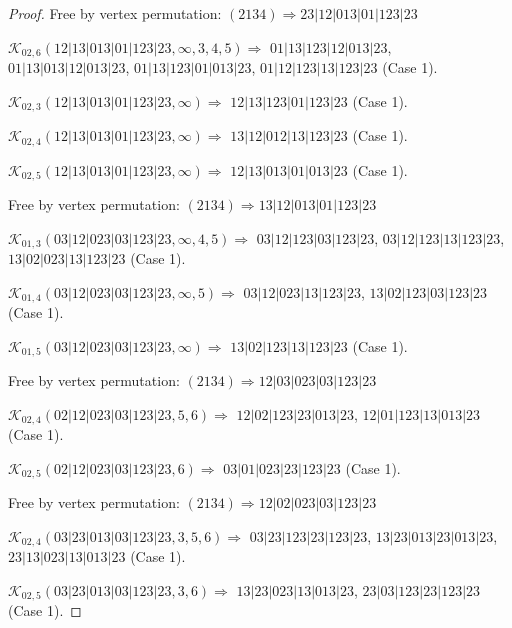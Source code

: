 \documentclass[12pt]{article}
\theoremstyle{plain}
\theoremstyle{definition}
\theoremstyle{remark}
\newcommand{\fancy}[1]{\mathcal{#1}}
\def\K{\fancy{K}}
\begin{document}
\begin{proof}
	Free by vertex permutation: $(2 1 3 4)\Rightarrow 23|12|013|01|123|23$
	
	
	
	\bigskip
	
	$\K_{02,6}(12|13|013|01|123|23,\infty,3, 4, 5)\Rightarrow $ $01|13|123|12|013|23$, $01|13|013|12|013|23$, $01|13|123|01|013|23$, $01|12|123|13|123|23$ (Case 1).
	
	$\K_{02,3}(12|13|013|01|123|23,\infty)\Rightarrow $ $12|13|123|01|123|23$ (Case 1).
	
	$\K_{02,4}(12|13|013|01|123|23,\infty)\Rightarrow $ $13|12|012|13|123|23$ (Case 1).
	
	$\K_{02,5}(12|13|013|01|123|23,\infty)\Rightarrow $ $12|13|013|01|013|23$ (Case 1).
	
	
	
	Free by vertex permutation: $(2 1 3 4)\Rightarrow 13|12|013|01|123|23$
	
	
	
	\bigskip
	
	$\K_{01,3}(03|12|023|03|123|23,\infty,4, 5)\Rightarrow $ $03|12|123|03|123|23$, $03|12|123|13|123|23$, $13|02|023|13|123|23$ (Case 1).
	
	$\K_{01,4}(03|12|023|03|123|23,\infty,5)\Rightarrow $ $03|12|023|13|123|23$, $13|02|123|03|123|23$ (Case 1).
	
	$\K_{01,5}(03|12|023|03|123|23,\infty)\Rightarrow $ $13|02|123|13|123|23$ (Case 1).
	
	
	
	Free by vertex permutation: $(2 1 3 4)\Rightarrow 12|03|023|03|123|23$
	
	
	
	\bigskip
	
	$\K_{02,4}(02|12|023|03|123|23,5, 6)\Rightarrow $ $12|02|123|23|013|23$, $12|01|123|13|013|23$ (Case 1).
	
	$\K_{02,5}(02|12|023|03|123|23,6)\Rightarrow $ $03|01|023|23|123|23$ (Case 1).
	
	
	
	Free by vertex permutation: $(2 1 3 4)\Rightarrow 12|02|023|03|123|23$
	
	
	
	\bigskip
	
	$\K_{02,4}(03|23|013|03|123|23,3, 5, 6)\Rightarrow $ $03|23|123|23|123|23$, $13|23|013|23|013|23$, $23|13|023|13|013|23$ (Case 1).
	
	$\K_{02,5}(03|23|013|03|123|23,3, 6)\Rightarrow $ $13|23|023|13|013|23$, $23|03|123|23|123|23$ (Case 1).
	

\end{proof}
\end{document}
